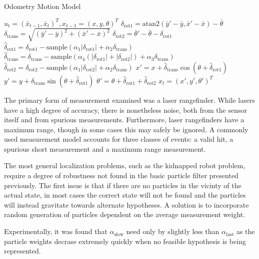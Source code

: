\documentclass[english]{article}
\begin{document}
\begin{algorithm}
\caption{Odometry Motion Model}
\label{alg:odometry_model}
\begin{algorithmic}
	\REQUIRE $u_t = (\bar{x}_{t-1},\bar{x}_t)^T, x_{t-1} = (x, y, \theta)^T$
        \STATE $\delta_{\mathrm{rot1}} = \mathrm{atan2}(\bar{y}' - \bar{y}, \bar{x}' - \bar{x}) - \bar{\theta}$
        \STATE $\delta_{\mathrm{trans}} = \sqrt{(\bar{y}' - \bar{y})^2 + (\bar{x}' - \bar{x})^2}$
        \STATE $\delta_{\mathrm{rot2}} = \bar{\theta}' - \bar{\theta} - \delta_{\mathrm{rot1}}$
        \STATE $\hat{\delta}_{\mathrm{rot1}} = \delta_{\mathrm{rot1}} - \textrm{sample}(\alpha_1|\delta_{\mathrm{rot1}}| + \alpha_2\delta_{\mathrm{trans}})$
        \STATE $\hat{\delta}_{\mathrm{trans}} = \delta_{\mathrm{trans}} - \textrm{sample}(\alpha_4(|\delta_{\mathrm{rot1}}| + |\delta_{\mathrm{rot2}}|)+ \alpha_3\delta_{\mathrm{trans}})$
        \STATE $\hat{\delta}_{\mathrm{rot2}} = \delta_{\mathrm{rot2}} - \textrm{sample}(\alpha_1|\delta_{\mathrm{rot2}}| + \alpha_2\delta_{\mathrm{trans}})$
        \STATE $x' = x + \hat{\delta}_{\mathrm{trans}}\cos{(\theta + \hat{\delta}_{\mathrm{rot1}})} $
        \STATE $y' = y + \hat{\delta}_{\mathrm{trans}}\sin{(\theta + \hat{\delta}_{\mathrm{rot1}})} $
        \STATE $\theta' = \theta + \hat{\delta}_{\mathrm{rot1}} + \hat{\delta}_{\mathrm{rot2}}$
        \RETURN $x_t = (x', y', \theta')^T$
\end{algorithmic}
\end{algorithm}

The primary form of measurement examined was a laser rangefinder. While lasers have a high degree of accuracy, there is nonetheless noise, both from the sensor itself and from spurious measurements. Furthermore, laser rangefinders have a maximum range, though in some cases this may safely be ignored. A commonly used measurement model accounts for three classes of events: a valid hit, a spurious short measurement and a maximum range measurement.

The most general localization problems, such as the kidnapped robot problem, require a degree of robustness not found in the basic particle filter presented previously. The first issue is that if there are no particles in the vicinty of the actual state, in most cases the correct state will not be found and the particles will instead gravitate towards alternate hypotheses. A solution is to incorporate random generation of particles dependent on the average measurement weight.

Experimentally, it was found that $\alpha_{\mathrm{slow}}$ need only by slightly less than $\alpha_{\mathrm{fast}}$ as the particle weights decrase extremely quickly when no feasible hypothesis is being represented.
\end{document}
